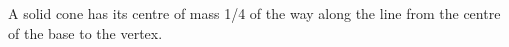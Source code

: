  A solid cone has its centre of mass 1/4 of the way
along the line from the centre of the base to the vertex.
